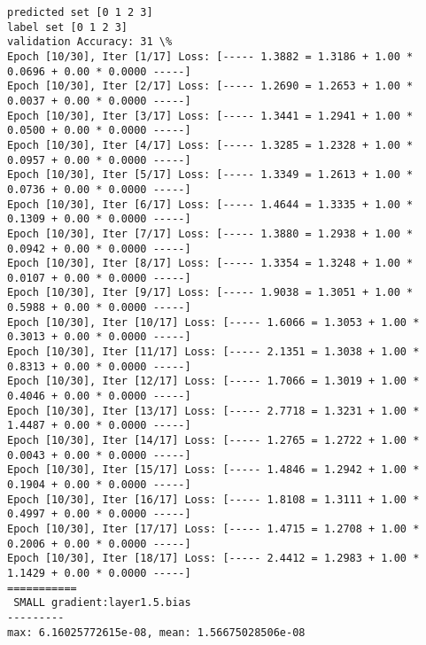 \documentclass[11pt]{article}
\begin{document}
    \begin{Verbatim}[commandchars=\\\{\}]
predicted set [0 1 2 3]
label set [0 1 2 3]
validation Accuracy: 31 \%
Epoch [10/30], Iter [1/17] Loss: [----- 1.3882 = 1.3186 + 1.00 * 0.0696 + 0.00 * 0.0000 -----]
Epoch [10/30], Iter [2/17] Loss: [----- 1.2690 = 1.2653 + 1.00 * 0.0037 + 0.00 * 0.0000 -----]
Epoch [10/30], Iter [3/17] Loss: [----- 1.3441 = 1.2941 + 1.00 * 0.0500 + 0.00 * 0.0000 -----]
Epoch [10/30], Iter [4/17] Loss: [----- 1.3285 = 1.2328 + 1.00 * 0.0957 + 0.00 * 0.0000 -----]
Epoch [10/30], Iter [5/17] Loss: [----- 1.3349 = 1.2613 + 1.00 * 0.0736 + 0.00 * 0.0000 -----]
Epoch [10/30], Iter [6/17] Loss: [----- 1.4644 = 1.3335 + 1.00 * 0.1309 + 0.00 * 0.0000 -----]
Epoch [10/30], Iter [7/17] Loss: [----- 1.3880 = 1.2938 + 1.00 * 0.0942 + 0.00 * 0.0000 -----]
Epoch [10/30], Iter [8/17] Loss: [----- 1.3354 = 1.3248 + 1.00 * 0.0107 + 0.00 * 0.0000 -----]
Epoch [10/30], Iter [9/17] Loss: [----- 1.9038 = 1.3051 + 1.00 * 0.5988 + 0.00 * 0.0000 -----]
Epoch [10/30], Iter [10/17] Loss: [----- 1.6066 = 1.3053 + 1.00 * 0.3013 + 0.00 * 0.0000 -----]
Epoch [10/30], Iter [11/17] Loss: [----- 2.1351 = 1.3038 + 1.00 * 0.8313 + 0.00 * 0.0000 -----]
Epoch [10/30], Iter [12/17] Loss: [----- 1.7066 = 1.3019 + 1.00 * 0.4046 + 0.00 * 0.0000 -----]
Epoch [10/30], Iter [13/17] Loss: [----- 2.7718 = 1.3231 + 1.00 * 1.4487 + 0.00 * 0.0000 -----]
Epoch [10/30], Iter [14/17] Loss: [----- 1.2765 = 1.2722 + 1.00 * 0.0043 + 0.00 * 0.0000 -----]
Epoch [10/30], Iter [15/17] Loss: [----- 1.4846 = 1.2942 + 1.00 * 0.1904 + 0.00 * 0.0000 -----]
Epoch [10/30], Iter [16/17] Loss: [----- 1.8108 = 1.3111 + 1.00 * 0.4997 + 0.00 * 0.0000 -----]
Epoch [10/30], Iter [17/17] Loss: [----- 1.4715 = 1.2708 + 1.00 * 0.2006 + 0.00 * 0.0000 -----]
Epoch [10/30], Iter [18/17] Loss: [----- 2.4412 = 1.2983 + 1.00 * 1.1429 + 0.00 * 0.0000 -----]
===========
 SMALL gradient:layer1.5.bias
---------
max: 6.16025772615e-08, mean: 1.56675028506e-08

    \end{Verbatim}

    \begin{center}
    \end{center}
    { \hspace*{\fill} \\}
    
    \begin{center}
    \end{center}
    { \hspace*{\fill} \\}
    
\end{document}
